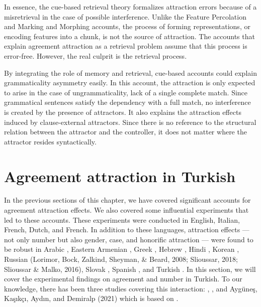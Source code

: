 In essence, the cue-based retrieval theory formalizes attraction errors because of a misretrieval in the case of possible interference. Unlike the Feature Percolation and Marking and Morphing accounts, the process of forming representations, or encoding features into a chunk, is not the source of attraction. The accounts that explain agreement attraction as a retrieval problem assume that this process is error-free. However, the real culprit is the retrieval process.

By integrating the role of memory and retrieval, cue-based accounts could explain grammaticality asymmetry easily. In this account, the attraction is only expected to arise in the case of ungrammaticality, lack of a single complete match. Since grammatical sentences satisfy the dependency with a full match, no interference is created by the presence of attractors. It also explains the attraction effects induced by clause-external attractors. Since there is no reference to the structural relation between the attractor and the controller, it does not matter where the attractor resides syntactically. 



\section{Agreement attraction in Turkish}

In the previous sections of this chapter, we have covered significant accounts for agreement attraction effects. We also covered some influential experiments that led to these accounts. These experiments were conducted in English, Italian, French, Dutch, and French. In addition to these languages, attraction effects --- not only number but also gender, case, and honorific attraction --- were found to be robust in Arabic \citep{TuckerEtAl:2015}, Eastern Armenian \citep{AvetisyanEtAl:2020}, Greek \citep{PaspaliMarinis2020}, Hebrew \citep{DeutschDank2011}, Hindi \citep{BhatiaDillon:2020}, Korean \citep{KwonSturt2016}, Russian (Lorimor, Bock, Zalkind, Sheyman, \& Beard, 2008; Slioussar, 2018; Slioussar \& Malko, 2016), Slovak \citep{BadeckerKuminiak2007}, Spanish \citep{LagoEtAl2015, LagoEtAl2021}, and Turkish \citep{LagoEtAl2019}. In this section, we will cover the experimental findings on agreement and number in Turkish. To our knowledge, there has been three studies covering this interaction: , , and Ayg\"une\c{s}, Ka\c{s}{\i}k\c{c}{\i}, Ayd{\i}n, and Demiralp (2021) which is based on . 

